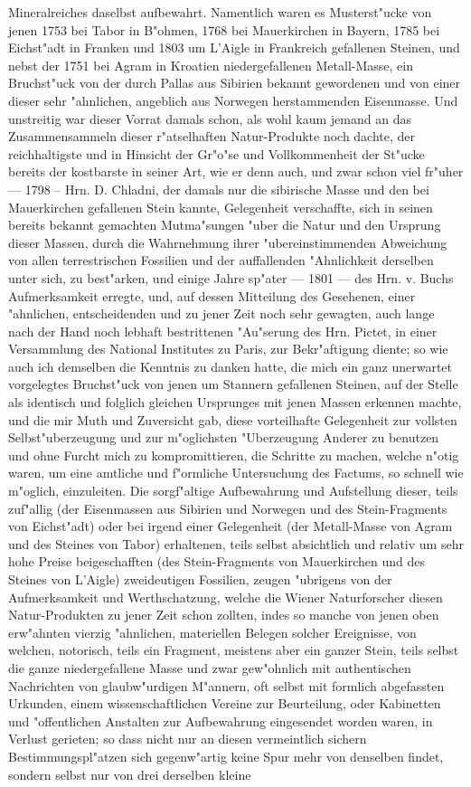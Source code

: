 \documentclass[a4paper, 11pt, oneside, german]{article}
\begin{document}
Mineralreiches daselbst aufbewahrt. Namentlich waren es Musterst"ucke von jenen 1753 bei Tabor in B"ohmen, 1768 bei Mauerkirchen in Bayern, 1785 bei Eichst"adt in Franken und 1803 um L'Aigle in Frankreich gefallenen Steinen, und nebst der 1751 bei Agram in Kroatien niedergefallenen Metall-Masse, ein Bruchst"uck von der durch Pallas aus Sibirien bekannt gewordenen und von einer dieser sehr "ahnlichen, angeblich aus Norwegen herstammenden Eisenmasse. Und unstreitig war dieser Vorrat damals schon, als wohl kaum jemand an das Zusammensammeln dieser r"atselhaften Natur-Produkte noch dachte, der reichhaltigste und in Hinsicht der Gr"o"se und Vollkommenheit der St"ucke bereits der kostbarste in seiner Art, wie er denn auch, und zwar schon viel fr"uher --- 1798 -- Hrn. D. Chladni, der damals nur die sibirische Masse und den bei Mauerkirchen gefallenen Stein kannte, Gelegenheit verschaffte, sich in seinen bereits bekannt gemachten Mutma"sungen "uber die Natur und den Ursprung dieser Massen, durch die Wahrnehmung ihrer "ubereinstimmenden Abweichung von allen terrestrischen Fossilien und der auffallenden "Ahnlichkeit derselben unter sich, zu best"arken, und einige Jahre sp"ater --- 1801 --- des Hrn. v. Buchs Aufmerksamkeit erregte, und, auf dessen Mitteilung des Gesehenen, einer "ahnlichen, entscheidenden und zu jener Zeit noch sehr gewagten, auch lange nach der Hand noch lebhaft bestrittenen "Au"serung des Hrn. Pictet, in einer Versammlung des National Institutes zu Paris, zur Bekr"aftigung diente; so wie auch ich demselben die Kenntnis zu danken hatte, die mich ein ganz unerwartet vorgelegtes Bruchst"uck von jenen um Stannern gefallenen Steinen, auf der Stelle als identisch und folglich gleichen Ursprunges mit jenen Massen erkennen machte, und die mir Muth und Zuversicht gab, diese vorteilhafte Gelegenheit zur vollsten Selbst"uberzeugung und zur m"oglichsten "Uberzeugung Anderer zu benutzen und ohne Furcht mich zu kompromittieren, die Schritte zu machen, welche n"otig waren, um eine amtliche und f"ormliche Untersuchung des Factums, so schnell wie m"oglich, einzuleiten. Die sorgf"altige Aufbewahrung und Aufstellung dieser, teils zuf"allig (der Eisenmassen aus Sibirien und Norwegen und des Stein-Fragments von Eichst"adt) oder bei irgend einer Gelegenheit (der Metall-Masse von Agram und des Steines von Tabor) erhaltenen, teils selbst absichtlich und relativ um sehr hohe Preise beigeschafften (des Stein-Fragments von Mauerkirchen und des Steines von L'Aigle) zweideutigen Fossilien, zeugen "ubrigens von der Aufmerksamkeit und Werthschatzung, welche die Wiener Naturforscher diesen Natur-Produkten zu jener Zeit schon zollten, indes so manche von jenen oben erw"ahnten vierzig "ahnlichen, materiellen Belegen solcher Ereignisse, von welchen, notorisch, teils ein Fragment, meistens aber ein ganzer Stein, teils selbst die ganze niedergefallene Masse und zwar gew"ohnlich mit authentischen Nachrichten von glaubw"urdigen M"annern, oft selbst mit formlich abgefassten Urkunden, einem wissenschaftlichen Vereine zur Beurteilung, oder Kabinetten und "offentlichen Anstalten zur Aufbewahrung eingesendet worden waren, in Verlust gerieten; so dass nicht nur an diesen vermeintlich sichern Bestimmungspl"atzen sich gegenw"artig keine Spur mehr von denselben findet, sondern selbst nur von drei derselben kleine 
\end{document}
